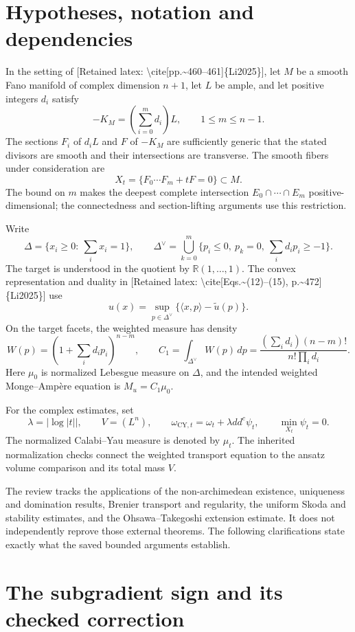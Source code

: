\documentclass[10pt]{article}
\begin{document}
\section*{Hypotheses, notation and dependencies}
In the setting of [Retained latex: \textbackslash{}cite[pp.\textasciitilde{}460--461]\{Li2025\}], let \(M\) be a smooth Fano manifold of complex dimension \(n+1\), let \(L\) be ample, and let positive integers \(d_i\) satisfy \[-K_M=\left(\sum_{i=0}^{m}d_i\right)L,\qquad 1\leq m\leq n-1.\] The sections \(F_i\) of \(d_iL\) and \(F\) of \(-K_M\) are sufficiently generic that the stated divisors are smooth and their intersections are transverse. The smooth fibers under consideration are \[X_t=\{F_0\cdots F_m+tF=0\}\subset M .\] The bound on \(m\) makes the deepest complete intersection \(E_0\cap\cdots\cap E_m\) positive-dimensional; the connectedness and section-lifting arguments use this restriction.\par
Write \[\Delta=\{x_i\geq0:\ \textstyle\sum_i x_i=1\},\qquad
 \Delta^\vee=\bigcup_{k=0}^{m}
 \{p_i\leq0,\ p_k=0,\ \textstyle\sum_i d_ip_i\geq-1\}.\] The target is understood in the quotient by \(\mathbb R(1,\ldots,1)\). The convex representation and duality in [Retained latex: \textbackslash{}cite[Eqs.\textasciitilde{}(12)--(15), p.\textasciitilde{}472]\{Li2025\}] use \[u(x)=\sup_{p\in\Delta^\vee}\{\langle x,p\rangle-\widetilde u(p)\}.\] On the target facets, the weighted measure has density \[W(p)=\left(1+\sum_i d_ip_i\right)^{n-m},\qquad
 C_1=\int_{\Delta^\vee}W(p)\,dp
 =\frac{(\sum_i d_i)(n-m)!}{n!\prod_i d_i}.\] Here \(\mu_0\) is normalized Lebesgue measure on \(\Delta\), and the intended weighted Monge–Ampère equation is \(M_u=C_1\mu_0\).\par
For the complex estimates, set \[\lambda=|\log|t||,\qquad V=(L^n),\qquad
 \omega_{\mathrm{CY},t}=\omega_t+\lambda dd^c\psi_t,\qquad
 \min_{X_t}\psi_t=0.\] The normalized Calabi–Yau measure is denoted by \(\mu_t\). The inherited normalization checks connect the weighted transport equation to the ansatz volume comparison and its total mass \(V\).\par
The review tracks the applications of the non-archimedean existence, uniqueness and domination results, Brenier transport and regularity, the uniform Skoda and stability estimates, and the Ohsawa–Takegoshi extension estimate. It does not independently reprove those external theorems. The following clarifications state exactly what the saved bounded arguments establish.\par
\section*{The subgradient sign and its checked correction}
\end{document}
